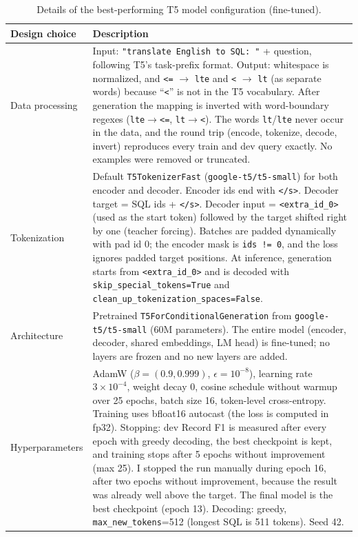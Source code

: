 \documentclass[11pt]{article}
\begin{document}
\begin{table}[H]
\centering
\begin{tabularx}{\textwidth}{@{}lY@{}}
\toprule
Design choice & Description \\
\midrule
Data processing &
Input: \texttt{"translate English to SQL: "} + question, following T5's task-prefix format. Output: whitespace is
normalized, and \texttt{<=} $\to$ \texttt{lte} and \texttt{<} $\to$ \texttt{lt} (as separate words) because
``\texttt{<}'' is not in the T5 vocabulary. After generation the mapping is inverted with word-boundary regexes
(\texttt{lte}$\to$\texttt{<=}, \texttt{lt}$\to$\texttt{<}). The words \texttt{lt}/\texttt{lte} never occur in the
data, and the round trip (encode, tokenize, decode, invert) reproduces every train and dev query exactly. No examples
were removed or truncated. \\
\addlinespace
Tokenization &
Default \texttt{T5TokenizerFast} (\texttt{google-t5/t5-small}) for both encoder and decoder. Encoder ids end with
\texttt{</s>}. Decoder target = SQL ids + \texttt{</s>}. Decoder input = \texttt{<extra\_id\_0>} (used as the
start token) followed by the target shifted right by one (teacher forcing). Batches are padded dynamically with pad
id 0; the encoder mask is \texttt{ids != 0}, and the loss ignores padded target positions. At inference, generation
starts from \texttt{<extra\_id\_0>} and is decoded with \texttt{skip\_special\_tokens=True} and
\texttt{clean\_up\_tokenization\_spaces=False}. \\
\addlinespace
Architecture &
Pretrained \texttt{T5ForConditionalGeneration} from \texttt{google-t5/t5-small} (60M parameters). The entire model
(encoder, decoder, shared embeddings, LM head) is fine-tuned; no layers are frozen and no new layers are added. \\
\addlinespace
Hyperparameters &
AdamW ($\beta=(0.9,0.999)$, $\epsilon=10^{-8}$), learning rate $3\times10^{-4}$, weight decay 0, cosine schedule
without warmup over 25 epochs, batch size 16, token-level cross-entropy. Training uses bfloat16 autocast (the loss
is computed in fp32). Stopping: dev Record F1 is measured after every epoch with greedy decoding, the best
checkpoint is kept, and training stops after 5 epochs without improvement (max 25). I stopped the run manually during
epoch 16, after two epochs without improvement, because the result was already well above the target. The final
model is the best checkpoint (epoch 13). Decoding: greedy, \texttt{max\_new\_tokens}=512 (longest SQL is 511 tokens).
Seed 42. \\
\bottomrule
\end{tabularx}
\caption{Details of the best-performing T5 model configuration (fine-tuned).}
\end{table}
\end{document}
